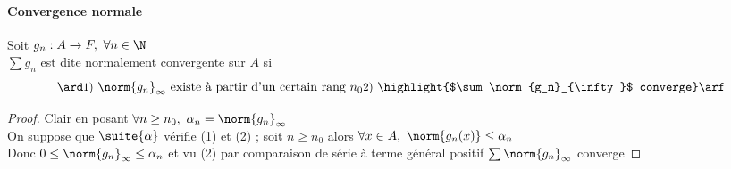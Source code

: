      \paragraph{Convergence normale}
         Soit $g_n :A\rightarrow F , ~\forall n\in\N$ \\ $\sum g_n$ est dite \underline{normalement convergente sur $A$} si \[ \ard ${\small 1)} 
         $\norm{g_n}_{\infty}$ existe à partir d'un certain rang $n_0 \\ ${\small 2)}  \highlight{$\sum \norm{g_n}_{\infty}$ converge}$ \arf \] 	 			\vspace*{-0.45cm}\trait 
     \begin{proof}
     \fbox{$\Rightarrow$} Clair en posant $\forall n\geq n_0 ,~\alpha_n = \norm{g_n}_{\infty}$ \\ \fbox{$\Leftarrow$} On suppose que 
     $\suite{\alpha}$ vérifie {\tiny (1)} et {\tiny (2)} ; soit $n\geq n_0 $ alors $\forall x\in A ,~ \norm{g_n(x)} \leq \alpha_n $ 
     \\Donc $0\leq \norm{g_n}_{\infty} \leq \alpha_n$ et vu {\tiny (2)} par comparaison de série à terme général positif 
     $\sum \norm{g_n}_{\infty}$ converge 
     \end{proof} ${}$ \\ 
